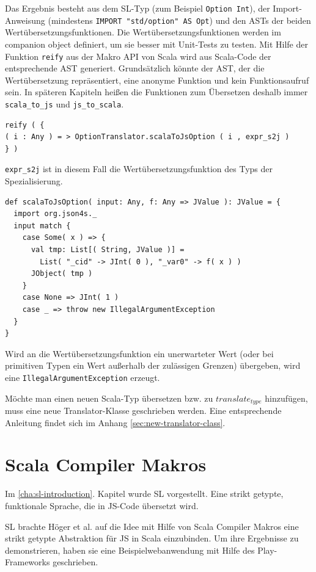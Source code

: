 \documentclass[12pt,bibtotoc]{scrreprt}
\begin{document}
Das Ergebnis besteht aus dem SL-Typ (zum Beispiel \lstinline!Option Int!), der Import-Anweisung (mindestens \lstinline!IMPORT "std/option" AS Opt!) und den ASTs der beiden Wertübersetzungsfunktionen. Die Wertübersetzungsfunktionen werden im companion object definiert, um sie besser mit Unit-Tests zu testen. Mit Hilfe der Funktion \lstinline!reify! aus der Makro API von Scala wird aus Scala-Code der entsprechende AST generiert. Grundsätzlich könnte der AST, der die Wertübersetzung repräsentiert, eine anonyme Funktion und kein Funktionsaufruf sein. In späteren Kapiteln heißen die Funktionen zum Übersetzen deshalb immer \lstinline!scala_to_js! und \lstinline!js_to_scala!.

\begin{lstlisting}
reify ( {
( i : Any ) = > OptionTranslator.scalaToJsOption ( i , expr_s2j )
} )
\end{lstlisting}

\lstinline!expr_s2j! ist in diesem Fall die Wertübersetzungsfunktion des Typs der Spezialisierung. 

\begin{lstlisting}
def scalaToJsOption( input: Any, f: Any => JValue ): JValue = {
  import org.json4s._
  input match {
    case Some( x ) => {
      val tmp: List[( String, JValue )] = 
        List( "_cid" -> JInt( 0 ), "_var0" -> f( x ) )
      JObject( tmp )
    }
    case None => JInt( 1 )
    case _ => throw new IllegalArgumentException
  }
}
\end{lstlisting}

Wird an die Wertübersetzungsfunktion ein unerwarteter Wert (oder bei primitiven Typen ein Wert außerhalb der zulässigen Grenzen) übergeben, wird eine \lstinline!IllegalArgumentException! erzeugt.

Möchte man einen neuen Scala-Typ übersetzen bzw. zu $translate_{type}$ hinzufügen, muss eine neue Translator-Klasse geschrieben werden. Eine entsprechende Anleitung findet sich im Anhang \ref{sec:new-translator-class}.

\chapter{Scala Compiler Makros}
\label{chap:scala-compiler-macros}

Im \ref{cha:sl-introduction}. Kapitel wurde SL vorgestellt. Eine strikt getypte, funktionale Sprache, die in JS-Code übersetzt wird.

SL brachte Höger et al. auf die Idee mit Hilfe von Scala Compiler Makros eine strikt getypte Abstraktion für JS in Scala einzubinden\cite{Hoger2013}. Um ihre Ergebnisse zu demonstrieren, haben sie eine Beispielwebanwendung mit Hilfe des Play-Frameworks\cite{Play1} geschrieben. 
\end{document}
